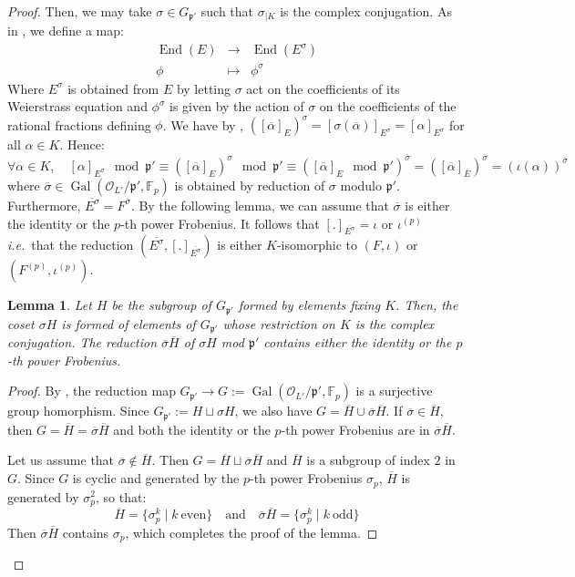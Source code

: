 \documentclass[a4paper,10pt]{report}
\theoremstyle{definition}
\theoremstyle{plain}
\newtheorem{lemma}[definition]{Lemma}
\theoremstyle{definition}
\newcommand{\ie}{\emph{i.e.}\ }
\newcommand{\F}{\mathbb{F}}
\newcommand{\mO}{\mathcal{O}}
\renewcommand{\(}{\left(}
\renewcommand{\)}{\right)}
\newcommand{\mfp}{\mathfrak{p}}
\DeclareMathOperator{\End}{End}
\DeclareMathOperator{\Gal}{Gal}
\begin{document}
\begin{proof}
Then, we may take $\sigma\in G_{\mfp'}$ such that $\sigma_{|K}$ is the complex conjugation. As in \cite[§ II.2]{Silverman2}, we define a map:
\[\begin{array}{rcl}\End(E)&\longrightarrow&\End(E^{\sigma})\\
\phi &\longmapsto &\phi^\sigma
\end{array}\]
Where $E^{\sigma}$ is obtained from $E$ by letting $\sigma$ act on the coefficients of its Weierstrass equation and $\phi^\sigma$ is given by the action of $\sigma$ on the coefficients of the rational fractions defining $\phi$. We have by \cite[theorem II.2.2.(a)]{Silverman2}, $([\overline{\alpha}]_E)^\sigma=[\sigma(\overline{\alpha})]_{E^\sigma}=[\alpha]_{E^\sigma}$ for all $\alpha\in K$.  Hence:
\[\forall\alpha\in K, \quad [\alpha]_{E^\sigma} \mod\mfp'\equiv ([\overline{\alpha}]_E)^\sigma \mod\mfp'\equiv \([\overline{\alpha}]_E \mod\mfp'\)^{\overline{\sigma}}= ([\overline{\alpha}]_{\overline{E}})^{\overline{\sigma}}= (\iota(\alpha))^{\overline{\sigma}}\]
where $\overline{\sigma}\in\Gal(\mO_{L'}/\mfp',\F_p)$ is obtained by reduction of $\sigma$ modulo $\mfp'$. Furthermore, $\overline{E^{\sigma}}=F^{\overline{\sigma}}$. By the following lemma, we can assume that $\overline{\sigma}$ is either the identity or the $p$-th power Frobenius. It follows that $[.]_{\overline{E^{\sigma}}}=\iota$ or $\iota^{(p)}$ \ie that the reduction $(\overline{E^{\sigma}},[.]_{\overline{E^{\sigma}}})$ is either $K$-isomorphic to $(F,\iota)$ or $(F^{(p)},\iota^{(p)})$.

\begin{lemma}
Let $H$ be the subgroup of $G_{\mfp'}$ formed by elements fixing $K$. Then, the coset $\sigma H$ is formed of elements of $G_{\mfp'}$ whose restriction on $K$ is the complex conjugation. The reduction $\overline{\sigma}\overline{H}$ of $\sigma H$ mod $\mfp'$ contains either the identity or the $p$-th power Frobenius.
\end{lemma}

\begin{proof}
By \cite[propostion I.14]{Lang_ANT}, the reduction map $G_{\mfp'}\longrightarrow G:=\Gal(\mO_{L'}/\mfp',\F_p)$ is a surjective group homorphism.  Since $G_{\mfp'}:=H\sqcup\sigma H$, we also have $G=\overline{H}\cup\overline{\sigma}\overline{H}$. If $\overline{\sigma}\in \overline{H}$, then $G=\overline{H}=\overline{\sigma}\overline{H}$ and both the identity or the $p$-th power Frobenius are in $\overline{\sigma}\overline{H}$.

Let us assume that $\overline{\sigma}\not\in \overline{H}$. Then $G=\overline{H}\sqcup\overline{\sigma}\overline{H}$ and $\overline{H}$ is a subgroup of index $2$ in $G$. Since $G$ is cyclic and generated by the $p$-th power Frobenius $\sigma_p$, $\overline{H}$ is generated by $\sigma_p^2$, so that:
\[\overline{H}=\{\sigma_p^k\mid k \ \mbox{even}\} \quad \mbox{and} \quad \overline{\sigma}\overline{H}=\{\sigma_p^k\mid k \ \mbox{odd}\}\]
Then $\overline{\sigma}\overline{H}$ contains $\sigma_p$, which completes the proof of the lemma. 
\end{proof}


\end{proof}
\end{document}
